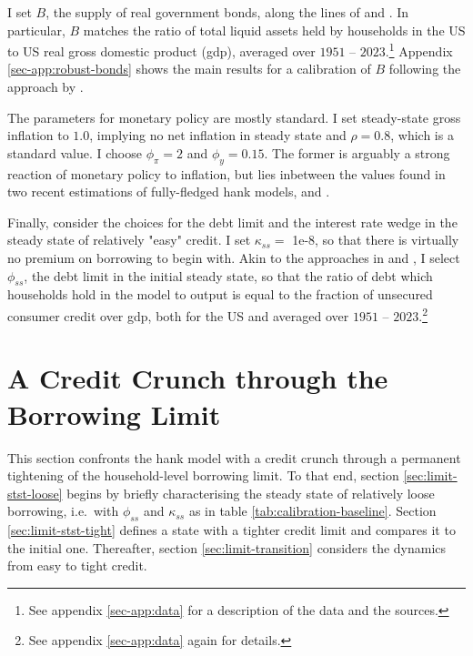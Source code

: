 \documentclass[12pt]{article} %
\numberwithin{equation}{section} %
\numberwithin{figure}{section}
\numberwithin{table}{section}
\begin{document}
I set $B$, the supply of real government bonds, along the lines of \textcite{mckay2016} and \textcite{gl2017}. In particular, $B$ matches the ratio of total liquid assets held by households in the US to US real gross domestic product (\Gls{gdp}), averaged over $1951$ -- $2023$.\footnote{See appendix \ref{sec-app:data} for a description of the data and the sources.} Appendix \ref{sec-app:robust-bonds} shows the main results for a calibration of $B$ following the approach by \textcite{bayer2023}.

The parameters for monetary policy are mostly standard. I set steady-state gross inflation to $1.0$, implying no net inflation in steady state and $\rho = 0.8$, which is a standard value. I choose $\phi_{\pi} = 2$ and $\phi_y = 0.15$. The former is arguably a strong reaction of monetary policy to inflation, but lies inbetween the values found in two recent estimations of fully-fledged \Gls{hank} models, \textcite{boehl2022} and \textcite{bayer2023}.

Finally, consider the choices for the debt limit and the interest rate wedge in the steady state of relatively "easy" credit. I set  $\kappa_{ss} = $ 1e-8, so that there is virtually no premium on borrowing to begin with. Akin to the approaches in \textcite{gl2017} and \textcite{bayer2023}, I select $\phi_{ss}$, the debt limit in the initial steady state, so that the ratio of debt which households hold in the model to output is equal to the fraction of unsecured consumer credit over \Gls{gdp}, both for the US and averaged over $1951$ -- $2023$.\footnote{See appendix \ref{sec-app:data} again for details.} %

\section{A Credit Crunch through the Borrowing Limit}
\label{sec:limit}

This section confronts the \Gls{hank} model with a credit crunch through a permanent tightening of the household-level borrowing limit. To that end, section \ref{sec:limit-stst-loose} begins by briefly characterising the steady state of relatively loose borrowing, i.e.~with $\phi_{ss}$ and $\kappa_{ss}$ as in table \ref{tab:calibration-baseline}. Section \ref{sec:limit-stst-tight} defines a state with a tighter credit limit and compares it to the initial one. Thereafter, section \ref{sec:limit-transition} considers the dynamics from easy to tight credit.
\end{document}
